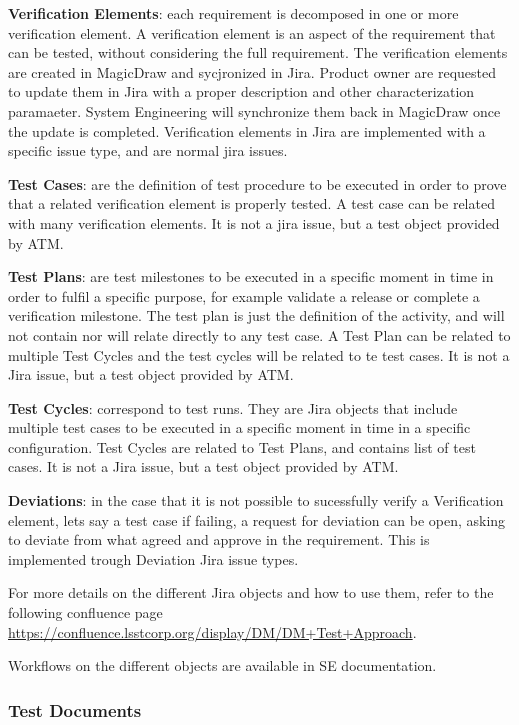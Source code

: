{\bf Verification Elements}: each requirement is decomposed in one or more verification element. A verification element is an aspect of the requirement that can be tested, without considering the full requirement. 
The verification elements are created in MagicDraw and sycjronized in Jira. 
Product owner are requested to update them in Jira with a proper description and other characterization paramaeter.
System Engineering will synchronize them back in MagicDraw once the update is completed.
Verification elements in Jira are implemented with a specific issue type, and are normal jira issues.

{\bf Test Cases}: are the definition of test procedure to be executed in order to prove that a related verification element is properly tested. A test case can be related with many verification elements. It is not a jira issue, but a test object provided by ATM.

{\bf Test Plans}: are test milestones to be executed in a specific moment in time in order to fulfil a specific purpose, for example validate a release or complete a verification milestone. 
The test plan is just the definition of the activity, and will not contain nor will relate directly to any test case. 
A Test Plan can be related to multiple Test Cycles and the test cycles will be related to te test cases. 
It is not a Jira issue, but a test object provided by ATM.

{\bf Test Cycles}: correspond to test runs. They are Jira objects that include multiple test cases to be executed in a specific moment in time in a specific configuration. Test Cycles are related to Test Plans, and contains list of test cases. 
It is not a Jira issue, but a test object provided by ATM.

{\bf Deviations}: in the case that it is not possible to sucessfully verify a Verification element, lets say a test case if failing,  a request for deviation can be open, asking to deviate from what agreed and approve in the requirement. 
This is implemented trough Deviation Jira issue types.

For more details on the different Jira objects and how to use them, refer to the following confluence page 
\url{https://confluence.lsstcorp.org/display/DM/DM+Test+Approach}.

Workflows on the different objects are available in SE documentation.


\subsubsection{Test Documents}

